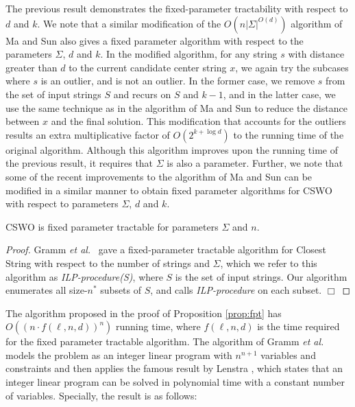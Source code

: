 The previous result demonstrates the fixed-parameter tractability with respect to $d$ and $k$. We note that a similar modification of the $O(n |\Sigma|^{O(d)})$ algorithm of Ma and Sun \cite{MS08} also gives a fixed parameter algorithm with respect to the parameters $\Sigma$, $d$ and $k$.  In the modified algorithm, for any string $s$ with distance greater than $d$ to the current candidate center string $x$, we again try the subcases where $s$ is an outlier, and is not an outlier.  In the former case, we remove $s$ from the set of input strings $S$ and recurs on $S$ and $k  - 1 $, and in the latter case, we use the same technique as in the algorithm of Ma and Sun \cite{MS08} to reduce the distance between $x$ and the final solution.  This modification that accounts for the outliers results an extra multiplicative factor of $O(2^{k +\log d})$ to the running time of the original algorithm.  Although this algorithm improves upon the running time of the previous result, it requires that $\Sigma$ is also a parameter.  Further, we note that some of the recent improvements \cite{CMW,WZ,ZZ} to the algorithm of Ma and Sun can be modified in a similar manner to obtain fixed parameter algorithms for CSWO with respect to parameters $\Sigma$, $d$ and $k$.

\begin{proposition} \label{prop:fpt} {\sc CSWO} is fixed parameter tractable for parameters $\Sigma$ and $n$. \end{proposition}

\begin{proof} Gramm {\em et al.}\ \cite{GNR03} gave a fixed-parameter tractable algorithm for {\sc Closest String} with respect to the number of strings and $\Sigma$, which we refer to this algorithm as {\em ILP-procedure(S)}, where $S$ is the set of input strings.  Our algorithm enumerates all size-$n^*$ subsets of $S$, and calls {\em ILP-procedure} on each subset.  \hfill $\Box$ \end{proof}

The algorithm proposed in the proof of Proposition \ref{prop:fpt} has $O\left( (n \cdot f(\ell, n, d))^n \right)$ running time, where $f(\ell, n, d)$ is the time required for the fixed parameter tractable algorithm.   The algorithm of Gramm {\em et al.}\ \cite{GNR03} models the problem as an integer linear program with $n^{n + 1}$ variables and constraints and then applies the famous result by Lenstra \cite{Len}, which states that an integer linear program can be solved in polynomial time with a constant number of variables.   Specially, the result is as follows:

